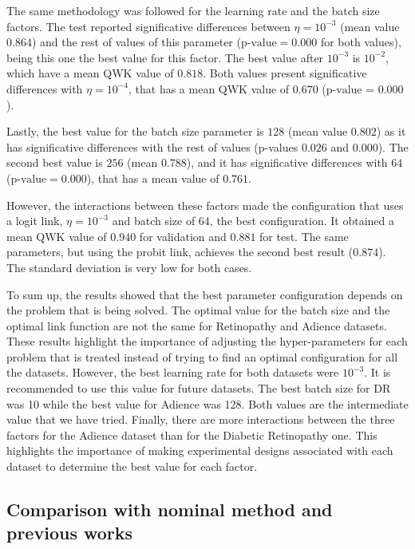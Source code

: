 \documentclass[journal]{IEEEtran}
\begin{document}
	The same methodology was followed for the learning rate and the batch size factors. The test reported significative differences between $\eta=10^{-3}$ (mean value $0.864$) and the rest of values of this parameter ($\text{p-value} = 0.000$ for both values), being this one the best value for this factor. The best value after $10^{-3}$ is $10^{-2}$, which have a mean QWK value of $0.818$. Both values present significative differences with $\eta=10^{-4}$, that has a mean QWK value of $0.670$ ($\text{p-value = 0.000}$).
	
	Lastly, the best value for the batch size parameter is $128$ (mean value $0.802$) as it has significative differences with the rest of values (p-values $0.026$ and $0.000$). The second best value is $256$ (mean $0.788$), and it has significative differences with $64$ ($\text{p-value} = 0.000$), that has a mean value of $0.761$.
	
	However, the interactions between these factors made the configuration that uses a logit link, $\eta=10^{-3}$ and batch size of 64, the best configuration. It obtained a mean QWK value of $0.940$ for validation and $0.881$ for test. The same parameters, but using the probit link, achieves the second best result ($0.874$). The standard deviation is very low for both cases.
	
	To sum up, the results showed that the best parameter configuration depends on the problem that is being solved. The optimal value for the batch size and the optimal link function are not the same for Retinopathy and Adience datasets. These results highlight the importance of adjusting the hyper-parameters for each problem that is treated instead of trying to find an optimal configuration for all the datasets. However, the best learning rate for both datasets were $10^{-3}$. It is recommended to use this value for future datasets.
	The best batch size for DR was 10 while the best value for Adience was 128. Both values are the intermediate value that we have tried.
	Finally, there are more interactions between the three factors for the Adience dataset than for the Diabetic Retinopathy one. This highlights the importance of making experimental designs associated with each dataset to determine the best value for each factor.
	
	\subsection{Comparison with nominal method and previous works}
	\label{app:NominalComparison}
	
\end{document}
